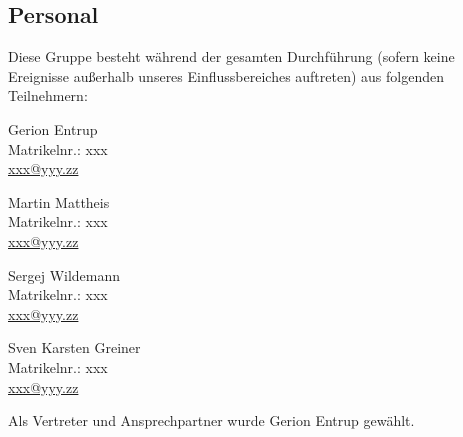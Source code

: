 \subsection{Personal}
\label{subsection:Pflichtenheft-Einfuehrung-Projektumfeld-Personal}

Diese Gruppe besteht während der gesamten Durchführung (sofern keine Ereignisse außerhalb unseres Einflussbereiches auftreten)  aus folgenden Teilnehmern:

\begin{multicols}{2}
    \parbox{\textwidth}{
        Gerion Entrup\\
        Matrikelnr.: xxx\\
        \href{mailto:xxx@yyy.zz}{xxx@yyy.zz}
    }

    \parbox{\textwidth}{
        Martin Mattheis\\
        Matrikelnr.: xxx\\
        \href{mailto:xxx@yyy.zz}{xxx@yyy.zz}
    }

    \parbox{\textwidth}{
        Sergej Wildemann\\
        Matrikelnr.: xxx\\
        \href{mailto:xxx@yyy.zz}{xxx@yyy.zz}
    }

    \parbox{\textwidth}{
        Sven Karsten Greiner\\
        Matrikelnr.: xxx\\
        \href{mailto:xxx@yyy.zz}{xxx@yyy.zz}
    }
\end{multicols}

Als Vertreter und Ansprechpartner wurde Gerion Entrup gewählt.

